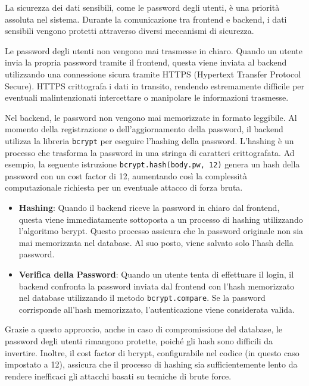 \documentclass[twoside]{supsistudent}
\begin{document}
La sicurezza dei dati sensibili, come le password degli utenti, è una priorità assoluta nel sistema. Durante la comunicazione tra frontend e backend, i dati sensibili vengono protetti attraverso diversi meccanismi di sicurezza.

Le password degli utenti non vengono mai trasmesse in chiaro. Quando un utente invia la propria password tramite il frontend, questa viene inviata al backend utilizzando una connessione sicura tramite HTTPS (Hypertext Transfer Protocol Secure). HTTPS crittografa i dati in transito, rendendo estremamente difficile per eventuali malintenzionati intercettare o manipolare le informazioni trasmesse.

Nel backend, le password non vengono mai memorizzate in formato leggibile. Al momento della registrazione o dell'aggiornamento della password, il backend utilizza la libreria \texttt{bcrypt} per eseguire l'hashing della password. L'hashing è un processo che trasforma la password in una stringa di caratteri crittografata. Ad esempio, la seguente istruzione \texttt{bcrypt.hash(body.pw, 12)} genera un hash della password con un cost factor di 12, aumentando così la complessità computazionale richiesta per un eventuale attacco di forza bruta.

\begin{itemize}
  \item \textbf{Hashing}: Quando il backend riceve la password in chiaro dal frontend, questa viene immediatamente sottoposta a un processo di hashing utilizzando l'algoritmo bcrypt. Questo processo assicura che la password originale non sia mai memorizzata nel database. Al suo posto, viene salvato solo l'hash della password.

  \item \textbf{Verifica della Password}: Quando un utente tenta di effettuare il login, il backend confronta la password inviata dal frontend con l'hash memorizzato nel database utilizzando il metodo \texttt{bcrypt.compare}. Se la password corrisponde all'hash memorizzato, l'autenticazione viene considerata valida.
\end{itemize}

Grazie a questo approccio, anche in caso di compromissione del database, le password degli utenti rimangono protette, poiché gli hash sono difficili da invertire. Inoltre, il cost factor di bcrypt, configurabile nel codice (in questo caso impostato a 12), assicura che il processo di hashing sia sufficientemente lento da rendere inefficaci gli attacchi basati su tecniche di brute force.
\end{document}
